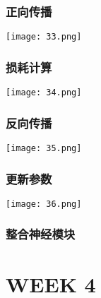 \documentclass[UTF_8]{ctexart}
\begin{document}
\subsubsection{正向传播}
\centering
\texttt{[image: 33.png]}
\clearpage

\subsubsection{损耗计算}
\centering
\texttt{[image: 34.png]}

\subsubsection{反向传播}
\centering
\texttt{[image: 35.png]}

\subsubsection{更新参数}
\centering
\texttt{[image: 36.png]}

\subsubsection{整合神经模块}

\clearpage
\section{WEEK 4}
\end{document}
